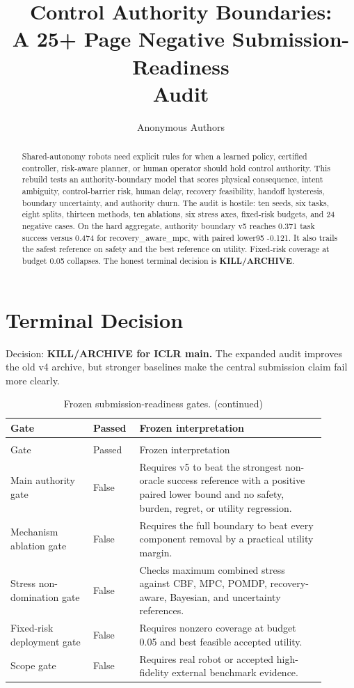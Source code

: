 \documentclass{article}
\title{Control Authority Boundaries:\\A 25+ Page Negative Submission-Readiness\\Audit}
\author{Anonymous Authors}
\newcommand{\methodname}{authority boundary v5}
\begin{document}
\maketitle

\begin{abstract}

Shared-autonomy robots need explicit rules for when a learned policy, certified controller, risk-aware planner, or human operator should hold control authority. This rebuild tests an authority-boundary model that scores physical consequence, intent ambiguity, control-barrier risk, human delay, recovery feasibility, handoff hysteresis, boundary uncertainty, and authority churn. The audit is hostile: ten seeds, six tasks, eight splits, thirteen methods, ten ablations, six stress axes, fixed-risk budgets, and 24 negative cases. On the hard aggregate, \methodname{} reaches 0.371 task success versus 0.474 for recovery\_aware\_mpc, with paired lower95 -0.121. It also trails the safest reference on safety and the best reference on utility. Fixed-risk coverage at budget 0.05 collapses. The honest terminal decision is \textbf{KILL/ARCHIVE}.

\end{abstract}

\section{Terminal Decision}

Decision: \textbf{KILL/ARCHIVE for ICLR main.} The expanded audit improves the old v4 archive, but stronger baselines make the central submission claim fail more clearly.

\begin{center}
\scriptsize
\begin{longtable}{p{0.24\linewidth}p{0.12\linewidth}p{0.54\linewidth}}
\caption{Frozen submission-readiness gates.}\label{tab:gates}\\
\toprule
Gate & Passed & Frozen interpretation\\
\midrule
\endfirsthead
\caption[]{Frozen submission-readiness gates. (continued)}\\
\toprule
Gate & Passed & Frozen interpretation\\
\midrule
\endhead
Main authority gate & False & Requires v5 to beat the strongest non-oracle success reference with a positive paired lower bound and no safety, burden, regret, or utility regression.\\
Mechanism ablation gate & False & Requires the full boundary to beat every component removal by a practical utility margin.\\
Stress non-domination gate & False & Checks maximum combined stress against CBF, MPC, POMDP, recovery-aware, Bayesian, and uncertainty references.\\
Fixed-risk deployment gate & False & Requires nonzero coverage at budget 0.05 and best feasible accepted utility.\\
Scope gate & False & Requires real robot or accepted high-fidelity external benchmark evidence.\\
\bottomrule
\end{longtable}
\normalsize
\end{center}
\end{document}
